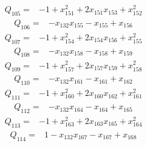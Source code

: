 \begin{equation*}\begin{split}
Q_{105}={}&-1 + x_{151}^{2} + 2x_{151} x_{153} + x_{152}^{2}
\end{split}\end{equation*}
\begin{equation*}\begin{split}
Q_{106}={}&-x_{132} x_{155} - x_{155} + x_{156}
\end{split}\end{equation*}
\begin{equation*}\begin{split}
Q_{107}={}&-1 + x_{154}^{2} + 2x_{154} x_{156} + x_{155}^{2}
\end{split}\end{equation*}
\begin{equation*}\begin{split}
Q_{108}={}&-x_{132} x_{158} - x_{158} + x_{159}
\end{split}\end{equation*}
\begin{equation*}\begin{split}
Q_{109}={}&-1 + x_{157}^{2} + 2x_{157} x_{159} + x_{158}^{2}
\end{split}\end{equation*}
\begin{equation*}\begin{split}
Q_{110}={}&-x_{132} x_{161} - x_{161} + x_{162}
\end{split}\end{equation*}
\begin{equation*}\begin{split}
Q_{111}={}&-1 + x_{160}^{2} + 2x_{160} x_{162} + x_{161}^{2}
\end{split}\end{equation*}
\begin{equation*}\begin{split}
Q_{112}={}&-x_{132} x_{164} - x_{164} + x_{165}
\end{split}\end{equation*}
\begin{equation*}\begin{split}
Q_{113}={}&-1 + x_{163}^{2} + 2x_{163} x_{165} + x_{164}^{2}
\end{split}\end{equation*}
\begin{equation*}\begin{split}
Q_{114}={}&1 - x_{132} x_{167} - x_{167} + x_{168}
\end{split}\end{equation*}
